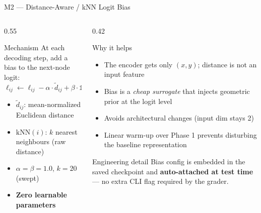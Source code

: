 \documentclass[aspectratio=169,11pt]{beamer}
\begin{document}
\begin{frame}{M2 --- Distance-Aware / kNN Logit Bias}
  \begin{columns}[T,totalwidth=\textwidth]
    \begin{column}{0.55\textwidth}
      \begin{block}{Mechanism}
        At each decoding step, add a bias to the next-node logit:
        $$
          \ell_{ij} \leftarrow \ell_{ij}
          - \alpha \cdot \tilde{d}_{ij}
          + \beta \cdot \mathbb{1}\!\left[j \in \mathrm{kNN}(i)\right]
        $$
        \begin{itemize}\setlength{\itemsep}{2pt}
          \item $\tilde{d}_{ij}$: mean-normalized Euclidean distance
          \item $\mathrm{kNN}(i)$: $k$ nearest neighbours (raw distance)
          \item $\alpha = \beta = 1.0$, $k = 20$ (swept)
          \item \textbf{Zero learnable parameters}
        \end{itemize}
      \end{block}
    \end{column}
    \begin{column}{0.42\textwidth}
      \begin{block}{Why it helps}
        \begin{itemize}
          \item The encoder gets only $(x, y)$; distance is not an input feature
          \item Bias is a \emph{cheap surrogate} that injects geometric prior at the logit level
          \item Avoids architectural changes (input dim stays 2)
          \item Linear warm-up over Phase 1 prevents disturbing the baseline representation
        \end{itemize}
      \end{block}
      \begin{alertblock}{Engineering detail}
        Bias config is embedded in the saved checkpoint and \textbf{auto-attached at test time} ---
        no extra CLI flag required by the grader.
      \end{alertblock}
    \end{column}
  \end{columns}
\end{frame}
\end{document}
